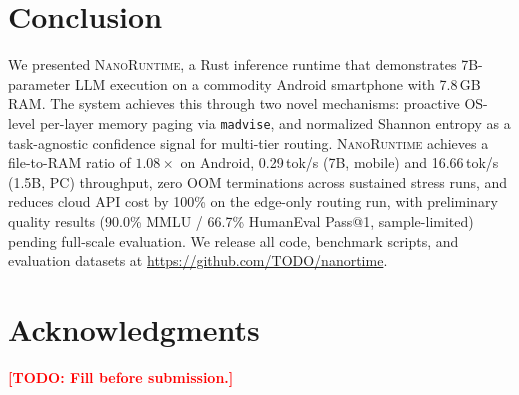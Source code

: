 \documentclass[11pt]{article}
\newcommand{\TODO}[1]{\textcolor{red}{\textbf{[TODO: #1]}}}
\newcommand{\nanort}{\textsc{NanoRuntime}}
\begin{document}
\section{Conclusion}
\label{sec:conclusion}

We presented \nanort{}, a Rust inference runtime that demonstrates
7B-parameter LLM execution on a commodity Android smartphone with
7.8\,GB RAM. The system achieves this through two novel mechanisms:
proactive OS-level per-layer memory paging via \texttt{madvise}, and
normalized Shannon entropy as a task-agnostic confidence signal for
multi-tier routing.
%
\nanort{} achieves a file-to-RAM ratio of $1.08\times$ on Android,
0.29\,tok/s (7B, mobile) and 16.66\,tok/s (1.5B, PC) throughput, zero OOM
terminations across sustained stress runs, and reduces cloud API cost by
100\% on the edge-only routing run, with preliminary quality results
(90.0\% MMLU / 66.7\% HumanEval Pass@1, sample-limited) pending full-scale
evaluation.
%
We release all code, benchmark scripts, and evaluation datasets
at \url{https://github.com/TODO/nanortime}.

\section*{Acknowledgments}
\TODO{Fill before submission.}



\end{document}
